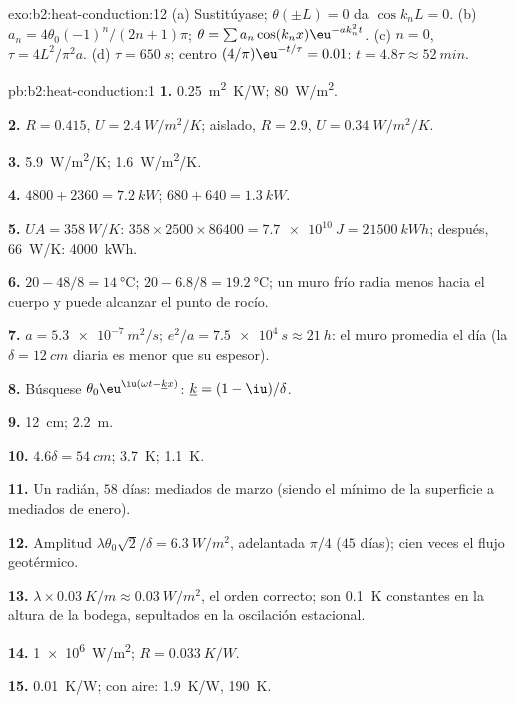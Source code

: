 \begin{solution}{exo:b2:heat-conduction:12}
(a) Sustitúyase; $\theta(\pm L) = 0$ da $\cos k_nL = 0$. (b) $a_n =
4\theta_0(-1)^n/(2n+1)\pi$; $\theta = \sum a_n\cos(k_nx)\eu^{-ak_n^2t}$. (c) $n = 0$,
$\tau = 4L^2/\pi^2a$. (d) $\tau = \qty{650}{s}$; centro $(4/\pi)\eu^{-t/\tau} = 0.01$:
$t = 4.8\tau \approx \qty{52}{min}$.
\end{solution}

\begin{solution}{pb:b2:heat-conduction:1}
\textbf{1.} \qty{0.25}{m^2.K/W}; \qty{80}{W/m^2}.

\textbf{2.} $R = 0.415$, $U = \qty{2.4}{W/m^2/K}$; aislado, $R = 2.9$, $U =
\qty{0.34}{W/m^2/K}$.

\textbf{3.} \qty{5.9}{W/m^2/K}; \qty{1.6}{W/m^2/K}.

\textbf{4.} $4800 + 2360 = \qty{7.2}{kW}$; $680 + 640 = \qty{1.3}{kW}$.

\textbf{5.} $UA = \qty{358}{W/K}$: $358 \times 2500 \times 86400 = \qty{7.7e10}{J} =
\qty{21500}{kWh}$; después, \qty{66}{W/K}: \qty{4000}{kWh}.

\textbf{6.} $20 - 48/8 = \qty{14}{\celsius}$; $20 - 6.8/8 = \qty{19.2}{\celsius}$;
un muro frío radia menos hacia el cuerpo y puede alcanzar el punto de rocío.

\textbf{7.} $a = \qty{5.3e-7}{m^2/s}$; $e^2/a = \qty{7.5e4}{s} \approx \qty{21}{h}$: el
muro promedia el día (la $\delta = \qty{12}{cm}$ diaria es menor que
su espesor).

\textbf{8.} Búsquese $\theta_0\eu^{\iu(\omega t - \underline kx)}$: $\underline k = (1 - \iu)/\delta$.

\textbf{9.} \qty{12}{cm}; \qty{2.2}{m}.

\textbf{10.} $4.6\delta = \qty{54}{cm}$; \qty{3.7}{K}; \qty{1.1}{K}.

\textbf{11.} Un radián, $58$ días: mediados de marzo (siendo el mínimo de la
superficie a mediados de enero).

\textbf{12.} Amplitud $\lambda\theta_0\sqrt2/\delta = \qty{6.3}{W/m^2}$, adelantada
$\pi/4$ ($45$ días); cien veces el flujo geotérmico.

\textbf{13.} $\lambda \times \qty{0.03}{K/m} \approx \qty{0.03}{W/m^2}$, el orden correcto; son
\qty{0.1}{K} constantes en la altura de la bodega, sepultados en la
oscilación estacional.

\textbf{14.} \qty{1e6}{W/m^2}; $R = \qty{0.033}{K/W}$.

\textbf{15.} \qty{0.01}{K/W}; con aire: \qty{1.9}{K/W}, \qty{190}{K}.


\end{solution}
